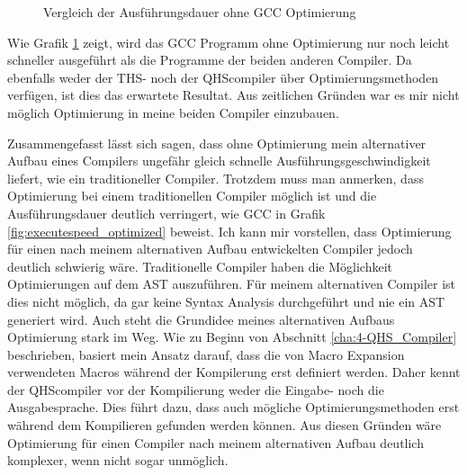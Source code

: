 \begin{figure}[H]
    \centering
    \label{fig:executespeed}
    \caption{Vergleich der Ausführungsdauer ohne GCC Optimierung}
\end{figure}

Wie Grafik \ref{fig:executespeed} zeigt, wird das GCC Programm ohne Optimierung nur noch leicht schneller ausgeführt als die Programme der beiden anderen Compiler.
Da ebenfalls weder der THS- noch der QHScompiler über Optimierungsmethoden verfügen, ist dies das erwartete Resultat.
Aus zeitlichen Gründen war es mir nicht möglich Optimierung in meine beiden Compiler einzubauen.

Zusammengefasst lässt sich sagen, dass ohne Optimierung mein alternativer Aufbau eines Compilers ungefähr gleich schnelle Ausführungsgeschwindigkeit liefert, wie ein traditioneller Compiler.
Trotzdem muss man anmerken, dass Optimierung bei einem traditionellen Compiler möglich ist und die Ausführungsdauer deutlich verringert, wie GCC in Grafik \ref{fig:executespeed_optimized} beweist.
Ich kann mir vorstellen, dass Optimierung für einen nach meinem alternativen Aufbau entwickelten Compiler jedoch deutlich schwierig wäre.
Traditionelle Compiler haben die Möglichkeit Optimierungen auf dem AST auszuführen. Für meinem alternativen Compiler ist dies nicht möglich, da gar keine Syntax Analysis durchgeführt und nie ein AST generiert wird.
Auch steht die Grundidee meines alternativen Aufbaus Optimierung stark im Weg.
Wie zu Beginn von Abschnitt \ref{cha:4-QHS_Compiler} beschrieben, basiert mein Ansatz darauf, dass die von Macro Expansion verwendeten Macros während der Kompilerung erst definiert werden.
Daher kennt der QHScompiler vor der Kompilierung weder die Eingabe- noch die Ausgabesprache. Dies führt dazu, dass auch mögliche Optimierungsmethoden erst während dem Kompilieren gefunden werden können.
Aus diesen Gründen wäre Optimierung für einen Compiler nach meinem alternativen Aufbau deutlich komplexer, wenn nicht sogar unmöglich.


